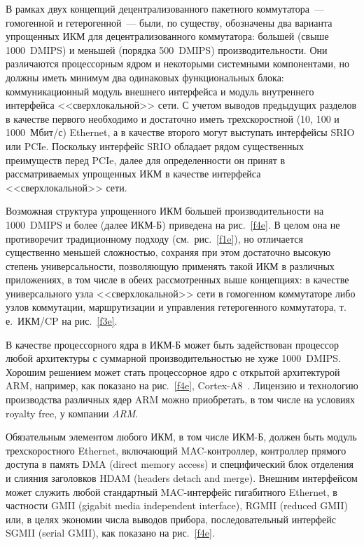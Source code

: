 \begin{multicols}{2}
     В рамках двух концепций децентрализованного пакетного коммутатора~--- гомогенной 
и гетерогенной~--- были, по существу, обозначены два варианта упрощенных ИКМ для 
децентрализованного коммутатора: большей (свыше 1000~DMIPS) и меньшей (порядка 
500~DMIPS) про\-из\-во\-ди\-тель\-ности. Они различаются процессорным ядром и некоторыми 
системными компонентами, но должны иметь минимум два одинаковых функциональных 
блока: коммуникационный модуль внешнего интерфейса и модуль внутреннего интерфейса 
<<сверх\-ло\-каль\-ной>> сети. С учетом выводов предыдущих разделов в качестве первого 
необходимо и достаточно иметь трехскоростной (10, 100 и 1000~Мбит/с) Ethernet, а в 
качестве второго могут выступать интерфейсы SRIO или PCIe. Поскольку интерфейс SRIO 
обладает рядом существенных преимуществ перед PCIe, далее для определенности он 
принят в рассматриваемых упрощенных ИКМ в качестве интерфейса <<сверхлокальной>> 
сети.

     
     Возможная структура упрощенного ИКМ б$\acute{\mbox{о}}$льшей 
производительности на 1000~DMIPS и более (далее ИКМ-Б) приведена на рис.~\ref{f4e}. В 
целом она не противоречит традиционному подходу (см.\ рис.~\ref{f1e}), но отличается 
существенно меньшей сложностью, сохраняя при этом достаточно высокую степень 
универсальности, позволяющую применять такой ИКМ в различных приложениях, в том 
числе в обеих рассмотренных выше концепциях: в качестве универсального узла 
<<сверхлокальной>> сети в гомогенном коммутаторе либо узлов коммутации, 
маршрутизации и управления гетерогенного коммутатора, т.\,е.\ ИКМ/CP на 
рис.~\ref{f3e}.

     В качестве процессорного ядра в ИКМ-Б может быть задействован процессор любой 
архитектуры с суммарной производительностью не хуже 1000~DMIPS. Хорошим решением 
может стать процессорное ядро с открытой архитектурой ARM, например, как показано на 
рис.~\ref{f4e}, Cortex-A8~\cite{16e}. Лицензию и технологию производства различных ядер ARM 
можно приобретать, в том числе на условиях royalty free, у компании \textit{ARM}.
     
     Обязательным элементом любого ИКМ, в том числе ИКМ-Б, должен быть модуль 
трехскоростного Ethernet, включающий MAC-контроллер, контроллер прямого доступа в 
память DMA (direct memory access) и специфический блок отделения и слияния заголовков 
HDAM (headers detach and merge). Внешним интерфейсом может служить любой 
стандартный MAC-интерфейс гигабитного Ethernet, в частности GMII (gigabit media 
independent interface), RGMII (reduced GMII) или, в целях экономии числа выводов прибора, 
последовательный интерфейс SGMII (serial GMII), как показано на рис.~\ref{f4e}.


\end{multicols}
